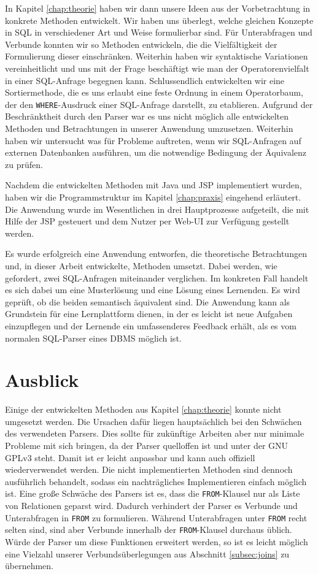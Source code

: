 In Kapitel \ref{chap:theorie} haben wir dann unsere Ideen aus der Vorbetrachtung in konkrete Methoden entwickelt. Wir haben uns überlegt, welche gleichen Konzepte in SQL in verschiedener Art und Weise formulierbar sind. Für Unterabfragen und Verbunde konnten wir so Methoden entwickeln, die die Vielfältigkeit der Formulierung dieser einschränken. Weiterhin haben wir syntaktische Variationen vereinheitlicht und uns mit der Frage beschäftigt wie man der Operatorenvielfalt in einer SQL-Anfrage begegnen kann. Schlussendlich entwickelten wir eine Sortiermethode, die es uns erlaubt eine feste Ordnung in einem Operatorbaum, der den \verb|WHERE|-Ausdruck einer SQL-Anfrage darstellt, zu etablieren. Aufgrund der Beschränktheit durch den Parser war es uns nicht möglich alle entwickelten Methoden und Betrachtungen in unserer Anwendung umzusetzen. Weiterhin haben wir untersucht was für Probleme auftreten, wenn wir SQL-Anfragen auf externen Datenbanken ausführen, um die notwendige Bedingung der Äquivalenz zu prüfen.

Nachdem die entwickelten Methoden mit Java und JSP implementiert wurden, haben wir die Programmstruktur im Kapitel \ref{chap:praxis} eingehend erläutert. Die Anwendung wurde im Wesentlichen in drei Hauptprozesse aufgeteilt, die mit Hilfe der JSP gesteuert und dem Nutzer per Web-UI zur Verfügung gestellt werden. 

Es wurde erfolgreich eine Anwendung entworfen, die theoretische Betrachtungen und, in dieser Arbeit entwickelte, Methoden umsetzt. Dabei werden, wie gefordert, zwei SQL-Anfragen miteinander verglichen. Im konkreten Fall handelt es sich dabei um eine Musterlösung und eine Lösung eines Lernenden. Es wird geprüft, ob die beiden semantisch äquivalent sind. Die Anwendung kann als Grundstein für eine Lernplattform dienen, in der es leicht ist neue Aufgaben einzupflegen und der Lernende ein umfassenderes Feedback erhält, als es vom normalen SQL-Parser eines DBMS möglich ist.

\section{Ausblick}

Einige der entwickelten Methoden aus Kapitel \ref{chap:theorie} konnte nicht umgesetzt werden. Die Ursachen dafür liegen hauptsächlich bei den Schwächen des verwendeten Parsers. Dies sollte für zukünftige Arbeiten aber nur minimale Probleme mit sich bringen, da der Parser quelloffen ist und unter der GNU GPLv3 steht. Damit ist er leicht anpassbar und kann auch offiziell wiederverwendet werden. Die nicht implementierten Methoden sind dennoch ausführlich behandelt, sodass ein nachträgliches Implementieren einfach möglich ist. Eine große Schwäche des Parsers ist es, dass die \verb|FROM|-Klausel nur als Liste von Relationen geparst wird. Dadurch verhindert der Parser es Verbunde und Unterabfragen in \verb|FROM| zu formulieren. Während Unterabfragen unter \verb|FROM| recht selten sind, sind aber Verbunde innerhalb der \verb|FROM|-Klausel durchaus üblich. Würde der Parser um diese Funktionen erweitert werden, so ist es leicht möglich eine Vielzahl unserer Verbundsüberlegungen aus Abschnitt \ref{subsec:joins} zu übernehmen.

